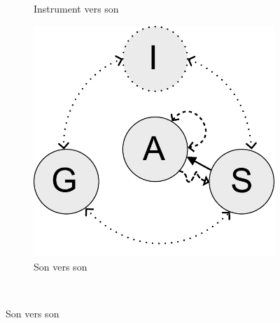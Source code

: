 \begin{figure}[!htbp]
{\begin{subfigure}[b]{.33\textwidth}
			\caption{Instrument vers son}
		\end{subfigure}%
		\hspace{.02\linewidth}
		\begin{subfigure}[b]{.33\textwidth}
			\centering
			\includegraphics[width=0.9\linewidth]{gfx/03_gesture/gesture-inference-f.pdf}
			\caption{Son vers son}
		\end{subfigure}%
	}\\
\end{figure}
